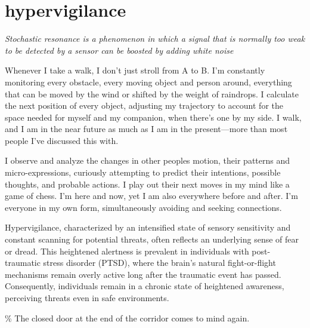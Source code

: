\chapter*{hypervigilance}
\begin{center}
\vspace{2cm}
\begin{flushright}
\large
\textit{Stochastic resonance is a phenomenon in which a signal that is normally too weak to be detected by a sensor can be boosted by adding white noise}
\end{flushright}
\vspace{2cm}
\end{center}
\normalsize

\newpage 
Whenever I take a walk, I don't just stroll from A to B. I'm constantly monitoring every obstacle, every moving object and person around, everything that can be moved by the wind or shifted by the weight of raindrops. I calculate the next position of every object, adjusting my trajectory to account for the space needed for myself and my companion, when there's one by my side. I walk, and I am in the near future as much as I am in the present—more than most people I've discussed this with.

I observe and analyze the changes in other peoples motion, their patterns and micro-expressions, curiously attempting to predict their intentions, possible thoughts, and probable actions. I play out their next moves in my mind like a game of chess. I'm here and now, yet I am also everywhere before and after. I'm everyone in my own form, simultaneously avoiding and seeking connections.

Hypervigilance, characterized by an intensified state of sensory sensitivity and constant scanning for potential threats, often reflects an underlying sense of fear or dread. This heightened alertness is prevalent in individuals with post-traumatic stress disorder (PTSD), where the brain's natural fight-or-flight mechanisms remain overly active long after the traumatic event has passed. Consequently, individuals remain in a chronic state of heightened awareness, perceiving threats even in safe environments.  

{\scriptsize \textcolor{comment}{\% The closed door at the end of the corridor comes to mind again. }}


